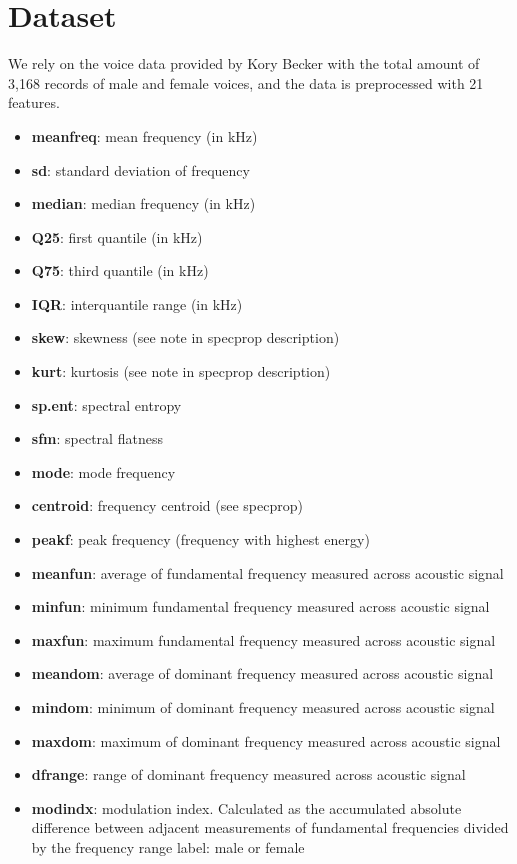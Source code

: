 \documentclass[natbib]{muthesis}
\begin{document}
 \section{Dataset}
 We rely on the voice data provided by Kory Becker with the total amount of 3,168 records of male and female voices, and the data is preprocessed with 21 features.\cite{Dataset}
 \begin{itemize}
 	  \setlength\itemsep{0em}
 \item \textbf{meanfreq}: mean frequency (in kHz)
 \item \textbf{sd}: standard deviation of frequency
 \item \textbf{median}: median frequency (in kHz)
 \item \textbf{Q25}: first quantile (in kHz)
 \item \textbf{Q75}: third quantile (in kHz)
 \item \textbf{IQR}: interquantile range (in kHz)
 \item \textbf{skew}: skewness (see note in specprop description)
 \item \textbf{kurt}: kurtosis (see note in specprop description)
 \item \textbf{sp.ent}: spectral entropy
 \item \textbf{sfm}: spectral flatness
 \item \textbf{mode}: mode frequency
 \item \textbf{centroid}: frequency centroid (see specprop)
 \item \textbf{peakf}: peak frequency (frequency with highest energy)
 \item \textbf{meanfun}: average of fundamental frequency measured across acoustic signal
 \item \textbf{minfun}: minimum fundamental frequency measured across acoustic signal
 \item \textbf{maxfun}: maximum fundamental frequency measured across acoustic signal
 \item \textbf{meandom}: average of dominant frequency measured across acoustic signal
 \item \textbf{mindom}: minimum of dominant frequency measured across acoustic signal
 \item \textbf{maxdom}: maximum of dominant frequency measured across acoustic signal
 \item \textbf{dfrange}: range of dominant frequency measured across acoustic signal
 \item \textbf{modindx}: modulation index. Calculated as the accumulated absolute difference between adjacent measurements of fundamental frequencies divided by the frequency range
 label: male or female
 \end{itemize}
\end{document}
